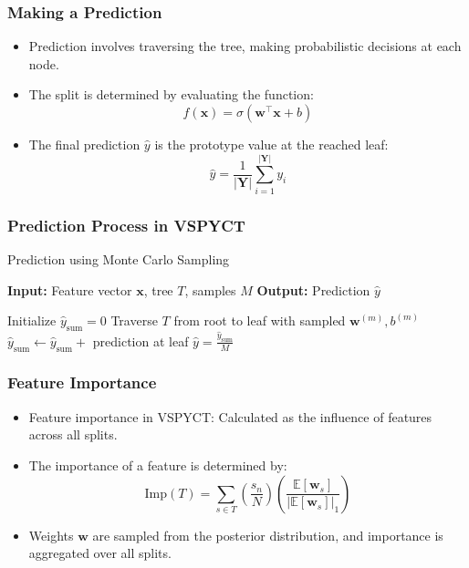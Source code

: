 \documentclass{beamer}
\begin{document}
\begin{frame}
  \frametitle{Making a Prediction}
  \begin{itemize}
    \item Prediction involves traversing the tree, making probabilistic decisions at each node.
    \item The split is determined by evaluating the function:
 \[
  f(\mathbf{x}) = \sigma \left(\mathbf{w}^\top \mathbf{x} + b \right)
  \]
    \item The final prediction $\hat{y}$ is the prototype value at the reached leaf:
    \[
    \hat{y} = \frac{1}{|\mathbf{Y}|} \sum_{i=1}^{|\mathbf{Y}|} y_i
    \]
  \end{itemize}
\end{frame}


\begin{frame}
  \frametitle{Prediction Process in VSPYCT}

  \footnotesize
  \setlength{\intextsep}{1pt}
  \setlength{\textfloatsep}{1pt}

  \begin{algorithm}[H]
    \caption{Prediction using Monte Carlo Sampling}
    \label{alg:make_pred}
    \begin{algorithmic}[1]
      \State \textbf{Input:} Feature vector $\mathbf{x}$, tree $T$, samples $M$
      \State \textbf{Output:} Prediction $\hat{y}$
      
      \State Initialize $\hat{y}_{\text{sum}} = 0$
        \State Traverse $T$ from root to leaf with sampled $\mathbf{w}^{(m)}, b^{(m)}$
        \State $\hat{y}_{\text{sum}} \gets \hat{y}_{\text{sum}} + $ prediction at leaf
      \EndFor
      \State \Return $\hat{y} = \frac{\hat{y}_{\text{sum}}}{M}$
    \end{algorithmic}
  \end{algorithm}
  
\end{frame}


\begin{frame}
  \frametitle{Feature Importance}
  \begin{itemize}
    \item Feature importance in VSPYCT: Calculated as the influence of features across all splits.
    \item The importance of a feature is determined by:
    \[
    \text{Imp}(T) = \sum_{s \in T} \left( \frac{s_n}{N} \right) \left( \frac{\mathbb{E}[\mathbf{w}_s]}{|\mathbb{E}[\mathbf{w}_s]|_1} \right)
    \]
    \item Weights $\mathbf{w}$ are sampled from the posterior distribution, and importance is aggregated over all splits.
  \end{itemize}
\end{frame}
\end{document}
